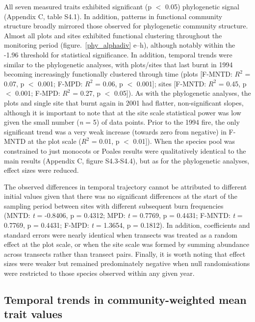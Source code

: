 All seven measured traits exhibited significant (p $<$ 0.05) phylogenetic signal (Appendix C, table S4.1). In addition, patterns in functional community structure broadly mirrored those observed for phylogenetic community structure. Almost all plots and sites exhibited functional clustering throughout the monitoring period (figure.~\ref{phy_alphadiv} e--h), although notably within the -1.96 threshold for statistical significance. In addition, temporal trends were similar to the phylogenetic analyses, with plots/sites that last burnt in 1994 becoming increasingly functionally clustered through time (plots [F-MNTD: $R^{2}$ = 0.07, p $<$ 0.001; F-MPD:  $R^{2}$ = 0.06, p $<$ 0.001]; sites [F-MNTD: $R^{2}$ = 0.45, p $<$ 0.001; F-MPD:  $R^{2}$ = 0.27, p $<$ 0.05]). As with the phylogenetic analyses, the plots and single site that burnt again in 2001 had flatter, non-significant slopes, although it is important to note that at the site scale statistical power was low given the small number (\textit{n} = 5) of data points. Prior to the 1994 fire, the only significant trend was a very weak increase (towards zero from negative) in F-MNTD at the plot scale ($R^{2}$ = 0.01, p $<$ 0.01]). When the species pool was constrained to just monocots or Poales results were qualitatively identical to the main results (Appendix C, figure S4.3-S4.4), but as for the phylogenetic analyses, effect sizes were reduced.

The observed differences in temporal trajectory cannot be attributed to different initial values given that there was no significant differences at the start of the sampling period between sites with different subsequent burn frequencies (MNTD: \textit{t} = -0.8406, p = 0.4312; MPD: \textit{t} = 0.7769, p = 0.4431; F-MNTD: \textit{t} = 0.7769, p = 0.4431; F-MPD: \textit{t} = 1.3654, p = 0.1812). In addition, coefficients and standard errors were nearly identical when transects was treated as a random effect at the plot scale, or when the site scale was formed by summing abundance across transects rather than transect pairs. Finally, it is worth noting that effect sizes were weaker but remained predominately negative when null randomisations were restricted to those species observed within any given year. 

\subsection{Temporal trends in community-weighted mean trait values}

